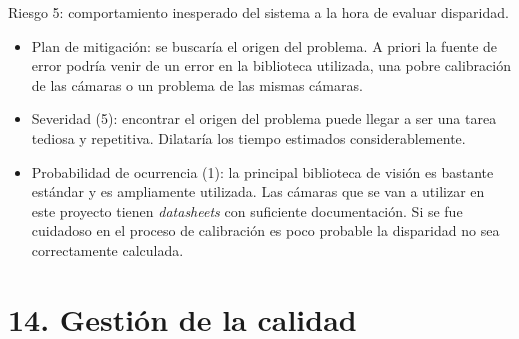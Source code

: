 \documentclass[
11pt, %
]{charter}
\begin{document}
Riesgo 5: comportamiento inesperado del sistema a la hora de evaluar disparidad. 
\begin{itemize}
	\item Plan de mitigación: se buscaría el origen del problema. A priori la fuente de error podría venir de un error en la biblioteca utilizada, una pobre calibración de las cámaras o un problema de las mismas cámaras.
	\item Severidad (5): encontrar el origen del problema puede llegar a ser una tarea tediosa y repetitiva. Dilataría los tiempo estimados considerablemente.
	\item Probabilidad de ocurrencia (1): la principal biblioteca de visión es bastante estándar y es ampliamente utilizada. Las cámaras que se van a utilizar en este proyecto tienen \emph{datasheets} con suficiente documentación. Si se fue cuidadoso en el proceso de calibración es poco probable la disparidad no sea correctamente calculada.
\end{itemize}

\section{14. Gestión de la calidad}
\label{sec:calidad}
\end{document}
